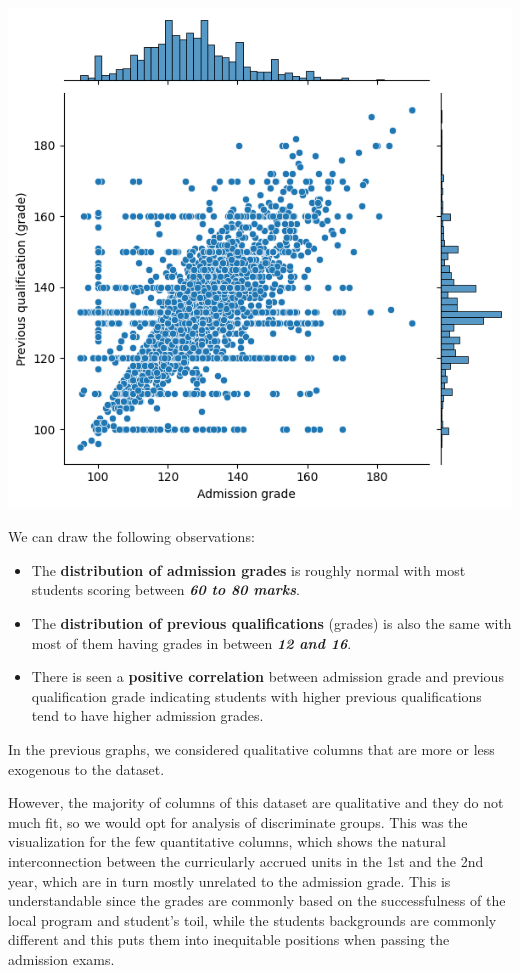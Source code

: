 \documentclass[
  letterpaper,
  DIV=11,
  numbers=noendperiod]{scrartcl}
\begin{document}
\includegraphics{report_AzadhdhinNedalYunisAlFraijat_files/figure-pdf/cell-20-output-1.png}

We can draw the following observations:

\begin{itemize}
\item
  The \textbf{distribution of admission grades} is roughly normal with
  most students scoring between \textbf{\emph{60 to 80 marks}}.
\item
  The \textbf{distribution of previous qualifications} (grades) is also
  the same with most of them having grades in between \textbf{\emph{12
  and 16}}.
\item
  There is seen a \textbf{positive correlation} between admission grade
  and previous qualification grade indicating students with higher
  previous qualifications tend to have higher admission grades.
\end{itemize}

In the previous graphs, we considered qualitative columns that are more
or less exogenous to the dataset.

However, the majority of columns of this dataset are qualitative and
they do not much fit, so we would opt for analysis of discriminate
groups. This was the visualization for the few quantitative columns,
which shows the natural interconnection between the curricularly accrued
units in the 1st and the 2nd year, which are in turn mostly unrelated to
the admission grade. This is understandable since the grades are
commonly based on the successfulness of the local program and student's
toil, while the students backgrounds are commonly different and this
puts them into inequitable positions when passing the admission exams.
\end{document}
